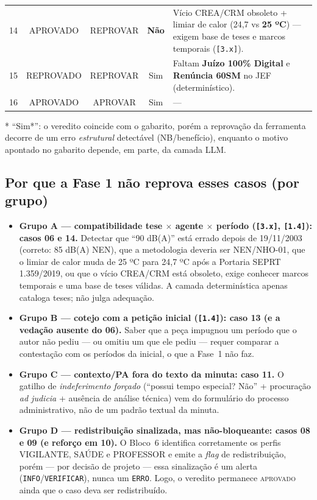 \documentclass[12pt,a4paper]{article}
\newcommand{\status}[1]{\texttt{#1}}
\begin{document}
\begin{longtable}{c c c c p{7.3cm}}
  14 & \textcolor{corOK}{APROVADO}  & REPROVAR & \textcolor{corERRO}{\textbf{Não}} & Vício CREA/CRM obsoleto + limiar de calor (24,7 vs \textbf{25 ºC}) --- exigem base de teses e marcos temporais (\texttt{[3.x]}). \\
  15 & \textcolor{corERRO}{REPROVADO} & REPROVAR & \textcolor{corOK}{Sim} & Faltam \textbf{Juízo 100\% Digital} e \textbf{Renúncia 60SM} no JEF (determinístico). \\
  16 & \textcolor{corOK}{APROVADO}  & APROVAR  & \textcolor{corOK}{Sim} & --- \\
  \bottomrule
\end{longtable}

\noindent\footnotesize{* ``Sim*'': o veredito coincide com o gabarito, porém a
reprovação da ferramenta decorre de um erro \emph{estrutural} detectável
(NB/benefício), enquanto o motivo apontado no gabarito depende, em parte, da
camada LLM.}\normalsize

\subsection*{Por que a Fase 1 não reprova esses casos (por grupo)}

\begin{itemize}[leftmargin=1.4em]
  \item \textbf{Grupo A --- compatibilidade tese $\times$ agente $\times$ período
        (\texttt{[3.x]}, \texttt{[1.4]}): casos 06 e 14.} Detectar que ``90 dB(A)''
        está errado depois de 19/11/2003 (correto: 85 dB(A) NEN), que a
        metodologia deveria ser NEN/NHO-01, que o limiar de calor muda de 25 ºC
        para 24,7 ºC após a Portaria SEPRT 1.359/2019, ou que o vício CREA/CRM
        está obsoleto, exige conhecer marcos temporais e uma base de teses
        válidas. A camada determinística apenas cataloga teses; não julga
        adequação.
  \item \textbf{Grupo B --- cotejo com a petição inicial (\texttt{[1.4]}): caso 13
        (e a vedação ausente do 06).} Saber que a peça impugnou um período que o
        autor não pediu --- ou omitiu um que ele pediu --- requer comparar a
        contestação com os períodos da inicial, o que a Fase~1 não faz.
  \item \textbf{Grupo C --- contexto/PA fora do texto da minuta: caso 11.} O
        gatilho de \emph{indeferimento forçado} (``possui tempo especial? Não'' +
        procuração \emph{ad judicia} + ausência de análise técnica) vem do
        formulário do processo administrativo, não de um padrão textual da
        minuta.
  \item \textbf{Grupo D --- redistribuição sinalizada, mas não-bloqueante: casos
        08 e 09 (e reforço em 10).} O Bloco~6 identifica corretamente os perfis
        VIGILANTE, SAÚDE e PROFESSOR e emite a \emph{flag} de redistribuição,
        porém --- por decisão de projeto --- essa sinalização é um alerta
        (\status{INFO}/\status{VERIFICAR}), nunca um \status{ERRO}. Logo, o
        veredito permanece \textsc{aprovado} ainda que o caso deva ser
        redistribuído.
\end{itemize}
\end{document}
